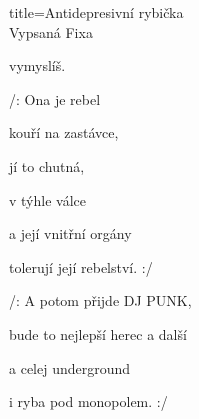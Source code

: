 \begin{song}{title=\centering Antidepresivní rybička \\\normalsize Vypsaná Fixa   \vspace*{-0.3cm}}
{\begin{minipage}[t]{0.48\textwidth}
  vymyslíš.


\sloka
 /:  Ona je rebel 
  
  kouří na zastávce,

  jí to chutná, 

  v týhle válce 

  a její vnitřní orgány

  tolerují její rebelství. :/

\sloka 
  /: A potom přijde DJ PUNK,

  bude to nejlepší herec a další 

  a celej underground 

  i ryba pod monopolem. :/



\end{minipage}
}
\setcounter{Slokočet}{0}
\end{song}

